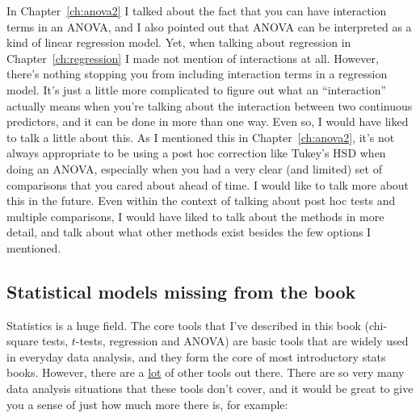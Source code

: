 \begin{itemize}
 In Chapter~\ref{ch:anova2} I talked about the fact that you can have interaction terms in an ANOVA, and I also pointed out that ANOVA can be interpreted as a kind of linear regression model. Yet, when talking about regression in Chapter~\ref{ch:regression} I made not mention of interactions at all. However, there's nothing stopping you from including interaction terms in a regression model. It's just a little more complicated to figure out what an ``interaction'' actually means when you're talking about the interaction between two continuous predictors, and it can be done in more than one way. Even so, I would have liked to talk a little about this. 
 As I mentioned this in Chapter~\ref{ch:anova2}, it's not always appropriate to be using a post hoc correction like Tukey's HSD when doing an ANOVA, especially when you had a very clear (and limited) set of comparisons that you cared about ahead of time. I would like to talk more about this in the future.
 Even within the context of talking about post hoc tests and multiple comparisons, I would have liked to talk about the methods in more detail, and talk about what other methods exist besides the few options I mentioned.
\end{itemize}

\subsection{Statistical models missing from the book}

Statistics is a huge field. The core tools that I've described in this book (chi-square tests, $t$-tests, regression and ANOVA) are basic tools that are widely used in everyday data analysis, and they form the core of most introductory stats books. However, there are a \underline{lot} of other tools out there. There are so very many data analysis situations that these tools don't cover, and it would be great to give you a sense of just how much more there is, for example: 

